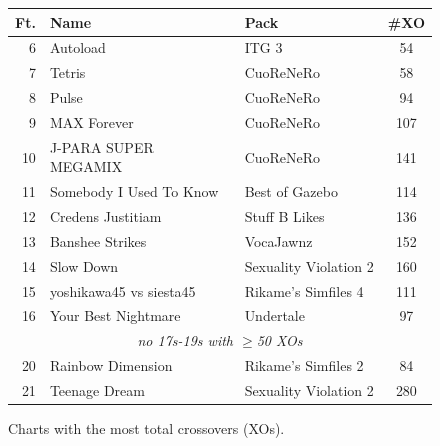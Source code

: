 \documentclass[10pt]{sigplanconf}
\begin{document}
\begin{figure}[t]
	\begin{center}
		\small
	\begin{tabular}{r|l|l|c}
		\bf Ft. & \bf Name & \bf Pack & \bf \#XO \\
		\hline
		 6 & Autoload                 & ITG 3                 &  54 \\
		 7 & Tetris                   & CuoReNeRo             &  58 \\
		 8 & Pulse                    & CuoReNeRo             &  94 \\
		 9 & MAX Forever              & CuoReNeRo             & 107 \\
		10 & J-PARA SUPER MEGAMIX     & CuoReNeRo             & 141 \\
		11 & Somebody I Used To Know  & Best of Gazebo        & 114 \\
		12 & Credens Justitiam        & Stuff B Likes         & 136 \\
		13 & Banshee Strikes          & VocaJawnz             & 152 \\
		14 & Slow Down                & Sexuality Violation 2 & 160 \\
		15 & yoshikawa45 vs siesta45  & Rikame's Simfiles 4   & 111 \\
		16 & Your Best Nightmare      & Undertale             &  97 \\
		\multicolumn{4}{c}{\em no 17s-19s with $\ge$50 XOs} \\
		20 & Rainbow Dimension        & Rikame's Simfiles 2   &  84 \\
		21 & Teenage Dream            & Sexuality Violation 2 & 280 \\
	\end{tabular}
	\end{center}
	\caption{Charts with the most total crossovers (XOs).}
\end{figure}
\end{document}
